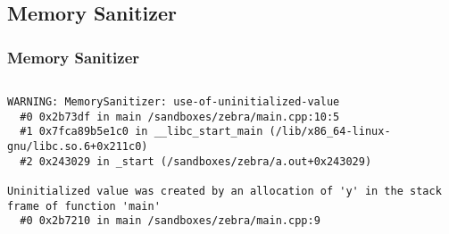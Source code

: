 \subsection{Memory Sanitizer}
\begin{frame}[fragile]
\frametitle{Memory Sanitizer}
  \inputminted[fontsize=\scriptsize,linenos]{cpp}{snippets/memory.cpp}
\pause
  \begin{Verbatim}[fontsize=\tiny]
WARNING: MemorySanitizer: use-of-uninitialized-value
  #0 0x2b73df in main /sandboxes/zebra/main.cpp:10:5
  #1 0x7fca89b5e1c0 in __libc_start_main (/lib/x86_64-linux-gnu/libc.so.6+0x211c0)
  #2 0x243029 in _start (/sandboxes/zebra/a.out+0x243029)

Uninitialized value was created by an allocation of 'y' in the stack frame of function 'main'
  #0 0x2b7210 in main /sandboxes/zebra/main.cpp:9
  \end{Verbatim}
\end{frame}
